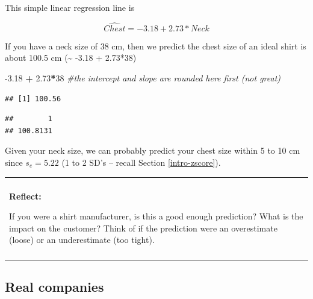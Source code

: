 \documentclass[]{book}
\newenvironment{Shaded}{\begin{snugshade}}{\end{snugshade}}
\newcommand{\CommentTok}[1]{\textcolor[rgb]{0.56,0.35,0.01}{\textit{#1}}}
\newcommand{\DataTypeTok}[1]{\textcolor[rgb]{0.13,0.29,0.53}{#1}}
\newcommand{\DecValTok}[1]{\textcolor[rgb]{0.00,0.00,0.81}{#1}}
\newcommand{\FloatTok}[1]{\textcolor[rgb]{0.00,0.00,0.81}{#1}}
\newcommand{\KeywordTok}[1]{\textcolor[rgb]{0.13,0.29,0.53}{\textbf{#1}}}
\newcommand{\NormalTok}[1]{#1}
\newcommand{\OperatorTok}[1]{\textcolor[rgb]{0.81,0.36,0.00}{\textbf{#1}}}
\newcommand{\StringTok}[1]{\textcolor[rgb]{0.31,0.60,0.02}{#1}}
\newenvironment{reflect}
{
    \begin{center}
    
    \begin{tabular}{|p{0.8\textwidth}|}
    \rowcolor{LightBlue}
    \hline\\
    \rowcolor{LightBlue}
    \textbf{Reflect:}
}
{
    \\\rowcolor{LightBlue}
    \\\hline
    \end{tabular} 
    \end{center}
}
\begin{document}
This simple linear regression line is

\[\widehat{Chest} = -3.18 + 2.73*Neck\]

If you have a neck size of 38 cm, then we predict the chest size of an ideal shirt is about 100.5 cm (\textasciitilde{} -3.18 + 2.73*38)

\begin{Shaded}
\begin{Highlighting}[]
\FloatTok{-3.18} \OperatorTok{+}\StringTok{ }\FloatTok{2.73}\OperatorTok{*}\DecValTok{38} \CommentTok{#the intercept and slope are rounded here first (not great)}
\end{Highlighting}
\end{Shaded}

\begin{verbatim}
## [1] 100.56
\end{verbatim}

\begin{Shaded}
\end{Shaded}

\begin{verbatim}
##        1 
## 100.8131
\end{verbatim}

Given your neck size, we can probably predict your chest size within 5 to 10 cm since \(s_e = 5.22\) (1 to 2 SD's -- recall Section \ref{intro-zscore}).

\begin{reflect}
If you were a shirt manufacturer, is this a good enough prediction? What
is the impact on the customer? Think of if the prediction were an
overestimate (loose) or an underestimate (too tight).
\end{reflect}

\hypertarget{real-companies}{%
\subsection{Real companies}\label{real-companies}}
\end{document}
